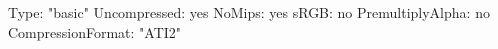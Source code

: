 Type: "basic"
Uncompressed: yes
NoMips: yes
sRGB: no
PremultiplyAlpha: no
CompressionFormat: "ATI2"
